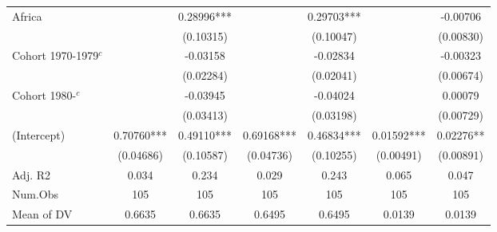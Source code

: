 \begin{tabular}[t]{lcccccc}
\hspace{1em}Africa &  & 0.28996*** &  & 0.29703*** &  & -0.00706\\
\hspace{1em} &  & (0.10315) &  & (0.10047) &  & (0.00830)\\
\hspace{1em}Cohort 1970-1979$^c$ &  & -0.03158 &  & -0.02834 &  & -0.00323\\
\hspace{1em} &  & (0.02284) &  & (0.02041) &  & (0.00674)\\
\hspace{1em}Cohort 1980-$^c$ &  & -0.03945 &  & -0.04024 &  & 0.00079\\
\hspace{1em} &  & (0.03413) &  & (0.03198) &  & (0.00729)\\
\hspace{1em}(Intercept) & 0.70760*** & 0.49110*** & 0.69168*** & 0.46834*** & 0.01592*** & 0.02276**\\
\hspace{1em} & (0.04686) & (0.10587) & (0.04736) & (0.10255) & (0.00491) & (0.00891)\\
\hspace{1em}Adj. R2 & 0.034 & 0.234 & 0.029 & 0.243 & 0.065 & 0.047\\
\midrule
\hspace{1em}Num.Obs & 105 & 105 & 105 & 105 & 105 & 105\\
\hspace{1em}Mean of DV & 0.6635 & 0.6635 & 0.6495 & 0.6495 & 0.0139 & 0.0139\\
\bottomrule
\end{tabular}
